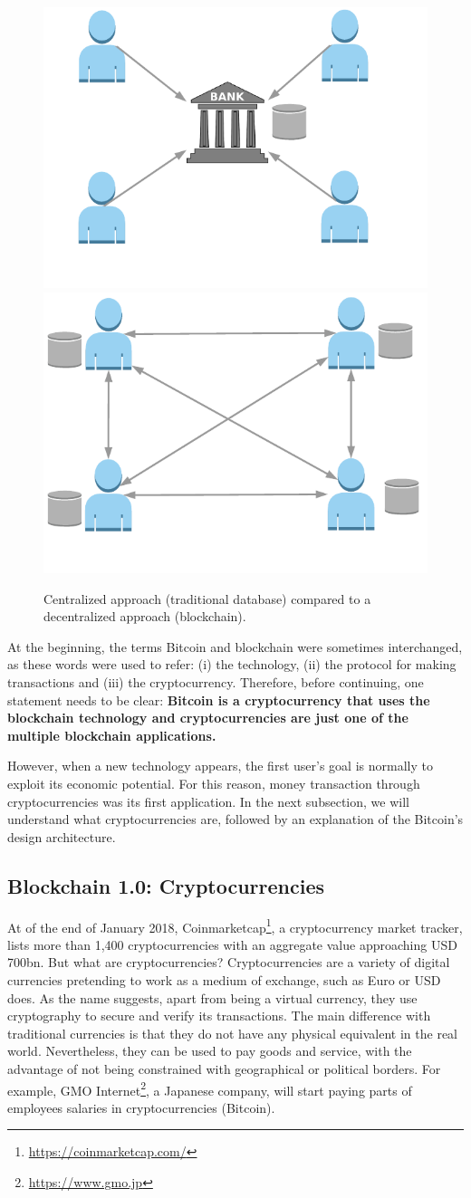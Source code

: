 \begin{figure}[bth]
	\myfloatalign
	{\includegraphics[width=0.4\linewidth]{gfx/cenVsDec}} \quad
	{\includegraphics[width=0.4\linewidth]{gfx/cenVsDec2}} \\
	\caption{Centralized approach (traditional database) compared to a decentralized approach (blockchain).}
	\label{fig:CentralizedvsDecentralized}
\end{figure}
At the beginning, the terms Bitcoin and blockchain were sometimes interchanged, as these words were used to refer: (i) the technology, (ii) the protocol for making transactions and (iii) the cryptocurrency. Therefore, before continuing, one statement needs to be clear: \textbf{Bitcoin is a cryptocurrency that uses the blockchain technology and cryptocurrencies are just one of the multiple blockchain applications.} 

However, when a new technology appears, the first user's goal is normally to exploit its economic potential. For this reason, money transaction through cryptocurrencies was its first application. In the next subsection, we will understand what cryptocurrencies are, followed by an explanation of the Bitcoin's design architecture.

\subsection{Blockchain 1.0: Cryptocurrencies}

At of the end of January 2018, Coinmarketcap\footnote{\url{https://coinmarketcap.com/}}, a cryptocurrency market tracker, lists more than 1,400 cryptocurrencies with an aggregate value approaching USD 700bn. But what are cryptocurrencies? Cryptocurrencies are a variety of digital currencies pretending to work as a medium of exchange, such as Euro or USD does. As the name suggests, apart from being a virtual currency, they use cryptography to secure and verify its transactions. The main difference with traditional currencies is that they do not have any physical equivalent in the real world. Nevertheless, they can be used to pay goods and service, with the advantage of not being constrained with geographical or political borders. For example, GMO Internet\footnote{\url{https://www.gmo.jp}}, a Japanese company, will start paying parts of employees salaries in cryptocurrencies (Bitcoin).

